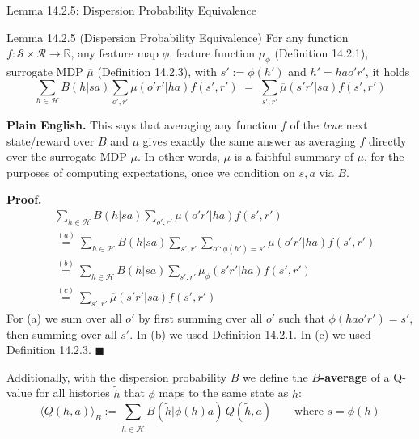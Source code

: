 \documentclass[aspectratio=169,10pt]{beamer}
\newcommand{\R}{\mathbb{R}}
\newcommand{\Hc}{\mathcal{H}}
\newcommand{\Sc}{\mathcal{S}}
\newcommand{\Rc}{\mathcal{R}}
\begin{document}
\begin{frame}[allowframebreaks]{Lemma 14.2.5: Dispersion Probability Equivalence}
  \begin{block}{Lemma 14.2.5 (Dispersion Probability Equivalence)}
    For any function $f:\Sc\times\Rc\to\R$, any feature map $\phi$,
    feature function $\mu_\phi$ (Definition 14.2.1), surrogate MDP
    $\overline\mu$ (Definition 14.2.3), with $s':=\phi(h')$ and
    $h'=hao'r'$, it holds
    \[
      \sum_{h\in\Hc}B(h|sa)\sum_{o',r'}\mu(o'r'|ha)f(s',r') \;=\; \sum_{s',r'}\overline{\mu}(s'r'|sa)f(s',r')
    \]
  \end{block}
  \textbf{Plain English.} This says that averaging any function $f$ of the
  \emph{true} next state/reward over $B$ and $\mu$ gives exactly the same
  answer as averaging $f$ directly over the surrogate MDP $\overline\mu$.
  In other words, $\overline\mu$ is a faithful summary of $\mu$, for the
  purposes of computing expectations, once we condition on $s,a$ via $B$.

  \framebreak

  \textbf{Proof.}
  \begin{align*}
    &\sum_{h\in\Hc}B(h|sa)\sum_{o',r'}\mu(o'r'|ha)f(s',r') \\
    &\overset{(a)}{=} \sum_{h\in\Hc}B(h|sa)\sum_{s',r'}\sum_{o':\phi(h')=s'}\mu(o'r'|ha)f(s',r') \\
    &\overset{(b)}{=} \sum_{h\in\Hc}B(h|sa)\sum_{s',r'}\mu_\phi(s'r'|ha)f(s',r') \\
    &\overset{(c)}{=} \sum_{s',r'}\overline{\mu}(s'r'|sa)f(s',r')
  \end{align*}
  For (a) we sum over all $o'$ by first summing over all $o'$ such that
  $\phi(hao'r')=s'$, then summing over all $s'$. In (b) we used Definition
  14.2.1. In (c) we used Definition 14.2.3. $\blacksquare$

  \vspace{0.4em}
  Additionally, with the dispersion probability $B$ we define the
  \textbf{$B$-average} of a Q-value for all histories $\tilde h$ that
  $\phi$ maps to the same state as $h$:
  \[
    \langle Q(h,a)\rangle_B := \sum_{\tilde h\in\Hc} B(\tilde h|\phi(h)a)\,Q(\tilde h,a) \qquad\text{where } s=\phi(h) \tag{14.2.6}
  \]
\end{frame}
\end{document}
